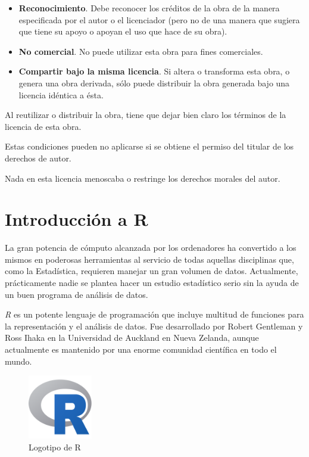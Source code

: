 \documentclass[
  a4paper,
]{scrreport}
\theoremstyle{definition}
\theoremstyle{remark}
\begin{document}
\begin{itemize}
\item
  \textbf{Reconocimiento}. Debe reconocer los créditos de la obra de la
  manera especificada por el autor o el licenciador (pero no de una
  manera que sugiera que tiene su apoyo o apoyan el uso que hace de su
  obra).
\item
  \textbf{No comercial}. No puede utilizar esta obra para fines
  comerciales.
\item
  \textbf{Compartir bajo la misma licencia}. Si altera o transforma esta
  obra, o genera una obra derivada, sólo puede distribuir la obra
  generada bajo una licencia idéntica a ésta.
\end{itemize}

Al reutilizar o distribuir la obra, tiene que dejar bien claro los
términos de la licencia de esta obra.

Estas condiciones pueden no aplicarse si se obtiene el permiso del
titular de los derechos de autor.

Nada en esta licencia menoscaba o restringe los derechos morales del
autor.


\hypertarget{introducciuxf3n-a-r}{%
\chapter{Introducción a R}\label{introducciuxf3n-a-r}}

La gran potencia de cómputo alcanzada por los ordenadores ha convertido
a los mismos en poderosas herramientas al servicio de todas aquellas
disciplinas que, como la Estadística, requieren manejar un gran volumen
de datos. Actualmente, prácticamente nadie se plantea hacer un estudio
estadístico serio sin la ayuda de un buen programa de análisis de datos.

\emph{R} es un potente lenguaje de programación que incluye multitud de
funciones para la representación y el análisis de datos. Fue
desarrollado por Robert Gentleman y Ross Ihaka en la Universidad de
Auckland en Nueva Zelanda, aunque actualmente es mantenido por una
enorme comunidad científica en todo el mundo.

\begin{figure}

{\centering \includegraphics[width=0.25\textwidth,height=\textheight]{./img/logos/Rlogo.png}

}

\caption{Logotipo de R}

\end{figure}
\end{document}

